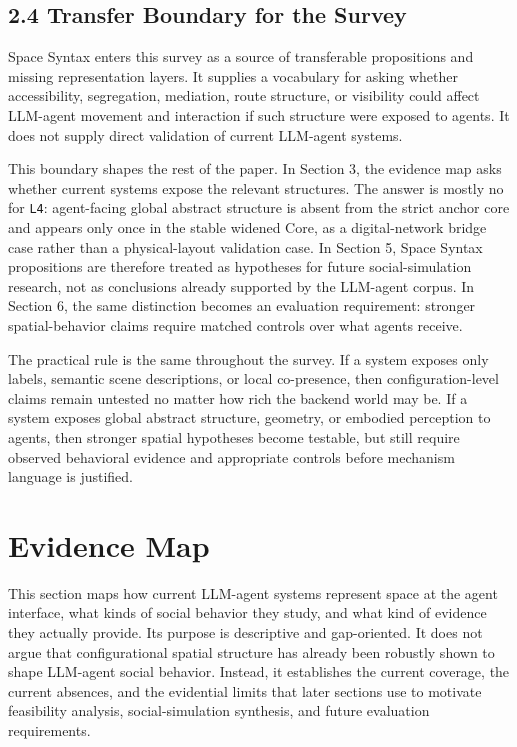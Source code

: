 \documentclass[
  twocolumn]{article}
\begin{document}
\subsection{2.4 Transfer Boundary for the
Survey}\label{transfer-boundary-for-the-survey}

Space Syntax enters this survey as a source of transferable propositions
and missing representation layers. It supplies a vocabulary for asking
whether accessibility, segregation, mediation, route structure, or
visibility could affect LLM-agent movement and interaction if such
structure were exposed to agents. It does not supply direct validation
of current LLM-agent systems.

This boundary shapes the rest of the paper. In Section 3, the evidence
map asks whether current systems expose the relevant structures. The
answer is mostly no for \texttt{L4}: agent-facing global abstract
structure is absent from the strict anchor core and appears only once in
the stable widened Core, as a digital-network bridge case rather than a
physical-layout validation case. In Section 5, Space Syntax propositions
are therefore treated as hypotheses for future social-simulation
research, not as conclusions already supported by the LLM-agent corpus.
In Section 6, the same distinction becomes an evaluation requirement:
stronger spatial-behavior claims require matched controls over what
agents receive.

The practical rule is the same throughout the survey. If a system
exposes only labels, semantic scene descriptions, or local co-presence,
then configuration-level claims remain untested no matter how rich the
backend world may be. If a system exposes global abstract structure,
geometry, or embodied perception to agents, then stronger spatial
hypotheses become testable, but still require observed behavioral
evidence and appropriate controls before mechanism language is
justified.

\section{Evidence Map}\label{evidence-map}

This section maps how current LLM-agent systems represent space at the
agent interface, what kinds of social behavior they study, and what kind
of evidence they actually provide. Its purpose is descriptive and
gap-oriented. It does not argue that configurational spatial structure
has already been robustly shown to shape LLM-agent social behavior.
Instead, it establishes the current coverage, the current absences, and
the evidential limits that later sections use to motivate feasibility
analysis, social-simulation synthesis, and future evaluation
requirements.
\end{document}
